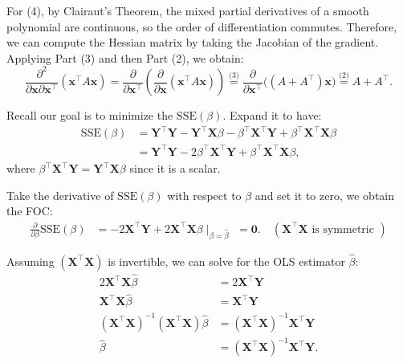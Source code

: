 \documentclass[12pt]{article}
\begin{document}
\begin{pfbox}
For (4), by Clairaut's Theorem, the mixed partial derivatives of a smooth polynomial are continuous, so the order of differentiation commutes. Therefore, we can compute the Hessian matrix by taking the Jacobian of the gradient. Applying Part (3) and then Part (2), we obtain:
$$ \frac{\partial^2}{\partial \mathbf{x} \partial \mathbf{x}^\top} (\mathbf{x}^\top A \mathbf{x}) = \frac{\partial}{\partial \mathbf{x}^\top} \left( \frac{\partial}{\partial \mathbf{x}} (\mathbf{x}^\top A \mathbf{x}) \right) \stackrel{\text{(3)}}{=} \frac{\partial}{\partial \mathbf{x}^\top} \Big( (A + A^\top)\mathbf{x} \Big) \stackrel{\text{(2)}}{=} A + A^\top. $$
\end{pfbox}

Recall our goal is to minimize the $\mathrm{SSE}(\beta)$.
Expand it to have:
\begin{align*}
    \mathrm{SSE}(\beta) &= \mathbf{Y}^\top \mathbf{Y} - \mathbf{Y}^\top \mathbf{X}\beta - \beta^\top \mathbf{X}^\top \mathbf{Y} + \beta^\top \mathbf{X}^\top \mathbf{X}\beta \\
             &= \mathbf{Y}^\top \mathbf{Y} - 2\beta^\top \mathbf{X}^\top \mathbf{Y} + \beta^\top \mathbf{X}^\top \mathbf{X}\beta,
\end{align*}
where $\beta^\top \mathbf{X}^\top \mathbf{Y} = \mathbf{Y}^\top \mathbf{X}\beta$ since it is a scalar.  

Take the derivative of $\mathrm{SSE}(\beta)$ with respect to $\beta$ and set it to zero, we obtain the FOC:
\begin{align*}
    \frac{\partial}{\partial \beta}\mathrm{SSE}(\beta) &= -2\mathbf{X}^\top \mathbf{Y} + 2\mathbf{X}^\top \mathbf{X}\beta\mid_{\beta=\hat\beta} \, \,= \mathbf{0}. \quad{ (\mathbf{X}^\top \mathbf{X}\text{ is symmetric })}
\end{align*}

Assuming $(\mathbf{X}^\top \mathbf{X})$ is invertible, we can solve for the OLS estimator $\hat{\beta}$:
\begin{align*}
    2\mathbf{X}^\top \mathbf{X}\hat{\beta} &= 2\mathbf{X}^\top \mathbf{Y} \\
    \mathbf{X}^\top \mathbf{X}\hat{\beta} &= \mathbf{X}^\top \mathbf{Y} \\
    (\mathbf{X}^\top \mathbf{X})^{-1}(\mathbf{X}^\top \mathbf{X})\hat{\beta} &= (\mathbf{X}^\top \mathbf{X})^{-1}\mathbf{X}^\top \mathbf{Y} \\
    \hat{\beta} &= (\mathbf{X}^\top \mathbf{X})^{-1}\mathbf{X}^\top \mathbf{Y}.
\end{align*}
\end{document}
